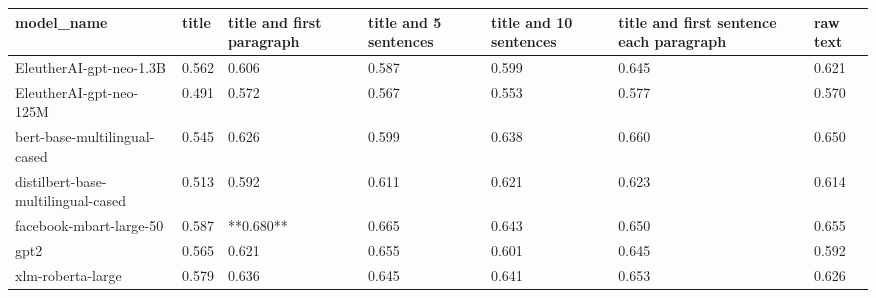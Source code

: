 \begin{tabular}{lllllll}
\toprule
                        model\_name & title & title and first paragraph & title and 5 sentences & title and 10 sentences & title and first sentence each paragraph & raw text \\
\midrule
           EleutherAI-gpt-neo-1.3B & 0.562 &                     0.606 &                 0.587 &                  0.599 &                                   0.645 &    0.621 \\
           EleutherAI-gpt-neo-125M & 0.491 &                     0.572 &                 0.567 &                  0.553 &                                   0.577 &    0.570 \\
      bert-base-multilingual-cased & 0.545 &                     0.626 &                 0.599 &                  0.638 &                                   0.660 &    0.650 \\
distilbert-base-multilingual-cased & 0.513 &                     0.592 &                 0.611 &                  0.621 &                                   0.623 &    0.614 \\
           facebook-mbart-large-50 & 0.587 &                 **0.680** &                 0.665 &                  0.643 &                                   0.650 &    0.655 \\
                              gpt2 & 0.565 &                     0.621 &                 0.655 &                  0.601 &                                   0.645 &    0.592 \\
                 xlm-roberta-large & 0.579 &                     0.636 &                 0.645 &                  0.641 &                                   0.653 &    0.626 \\
\bottomrule
\end{tabular}
